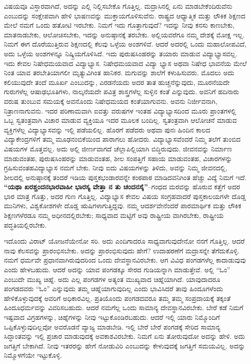 ವಿಷಯವೂ ವಿಸ್ತಾರವಾಗಿದೆ, ಅದನ್ನು ಎಲ್ಲಿ ನಿಲ್ಲಿಸಬೇಕೊ ಗೊತ್ತಿಲ್ಲ. ಮದ್ರಾಸಿನಲ್ಲಿ ಏನು ಮಾಡಬೇಕೆಂದಿರುವೆನು ಎಂಬುದನ್ನು ಸಂಕ್ಷೇಪವಾಗಿ ಹೇಳಿ ಭಾಷಣವನ್ನು ಮುಕ್ತಾಯಗೊಳಿಸುವೆನು. ರಾಷ್ಟ್ರದ ಆಧ್ಯಾತ್ಮಿಕ ಮತ್ತು ಲೌಕಿಕ ಶಿಕ್ಷಣದ ಮೇಲೆ ನಮಗೆ ಒಂದು ಹತೋಟಿ ಇರಬೇಕು. ನಿಮಗೆ ಇದು ಗೊತ್ತಾಗುವುದೆ? ಇದನ್ನು ನೀವು ಕನಸು ಕಾಣಬೇಕು, ಮಾತನಾಡಬೇಕು, ಆಲೋಚಿಸಬೇಕು, ಇದನ್ನು ಅನುಷ್ಠಾನಕ್ಕೆ ತರಬೇಕು. ಅಲ್ಲಿಯವರೆಗೂ ನಮ್ಮ ದೇಶಕ್ಕೆ ಮೋಕ್ಷ ಇಲ್ಲ. ನಿಮಗೆ ಈಗ ದೊರೆಯುತ್ತಿರುವ ಶಿಕ್ಷಣದಲ್ಲಿ ಕೆಲವು ಒಳ್ಳೆಯ ಅಂಶಗಳಿವೆ. ಆದರೆ ಅದರಲ್ಲಿ ಒಂದು ಮಹಾಲೋಪವಿದೆ, ಅದು ಒಳ್ಳೆಯ ಅಂಶಗಳನ್ನೂ ನಿಷ್ಕ್ರಿಯಗೊಳಿಸಿದೆ. ಇದು ಪುರುಷಸಿಂಹರನ್ನು ತಯಾರು ಮಾಡುವ ವಿದ್ಯಾಭ್ಯಾಸವಲ್ಲ. ಇದು ಕೇವಲ ನಿಷೇಧಮಯವಾದ ವಿದ್ಯಾಭ್ಯಾಸ. ನಿಷೇಧಮಯವಾದ ವಿದ್ಯಾ ಭ್ಯಾಸ ಅಥವಾ ನಿಷೇಧ ಭಾವನೆಯ ಮೇಲೆ ನಿಂತ ಯಾವ ತರಬೇತಿಯಾಗಲೀ ಮೃತ್ಯುವಿಗಿಂತ ಹಾನಿಕರ. ಮಗುವನ್ನು ಶಾಲೆಗೆ ಕಳುಹಿಸುವರು. ಮೊದಲು ಅದು ಕಲಿಯುವುದೇ ತಂದೆ ಮೂರ್ಖ ಎಂಬುದನ್ನು, ಎರಡನೆಯದು ಅದರ ತಾತ ಹುಚ್ಚನೆನ್ನುವುದು, ಮೂರನೆಯದೇ ಗುರುಗಳೆಲ್ಲ ಆಷಾಢಭೂತಿಗಳು, ನಾಲ್ಕನೆಯದೇ ಪವಿತ್ರ ಶಾಸ್ತ್ರಗಳೆಲ್ಲ ಸುಳ್ಳಿನ ಕಂತೆ ಎನ್ನುವುದು. ಅವನಿಗೆ ಹದಿನಾರು ವರುಷ ತುಂಬುವ ಸಮಯಕ್ಕೆ ಅವನೊಂದು ನಿಷೇಧಮಯದ ಕಂತೆಯಾಗುವನು. ಅವನು ನಿರ್ಜೀವನಾಗಿ, ನಿತ್ರಾಣನಾಗುವನು. ಇದರ ಪರಿಣಾಮವಾಗಿ ಐವತ್ತು ವರುಷಗಳ ಇಂತಹ ವಿದ್ಯಾಭ್ಯಾಸದಿಂದ ಮೂರು ಪ್ರಾಂತಗಳಲ್ಲಿ ಒಬ್ಬ ಸ್ವತಂತ್ರವಾಗಿ ವಿಚಾರ ಮಾಡುವ ವ್ಯಕ್ತಿಯೂ ಇದರ ಮೂಲಕ ಬಂದಿಲ್ಲ. ಸ್ವತಂತ್ರವಾಗಿ ಆಲೋಚನೆ ಮಾಡುವ ವ್ಯಕ್ತಿಗಳೆಲ್ಲ ವಿದ್ಯಾಭ್ಯಾಸವನ್ನು ಇಲ್ಲಿ ಪಡೆಯಲಿಲ್ಲ. ಹೊರಗೆ ಪಡೆದರು ಅಥವಾ ಪುನಃ ಹಿಂದಿನ ಕಾಲದ ವಿದ್ಯಾಕೇಂದ್ರಗಳಿಗೆ ತಮ್ಮ ಮೂಢನಂಬಿಕೆಯಿಂದ ಪಾರಾಗಲು ಹೋದರು. ವಿದ್ಯಾಭ್ಯಾಸವೆಂದರೆ ನಿಮ್ಮ ತಲೆಗೆ ತುಂಬಿದ ವಿಷಯಗಳ ಮೊತ್ತವಲ್ಲ. ಅದು ಅಲ್ಲಿ ಜೀರ್ಣವಾಗದೆ ಚೆಲ್ಲಾಪಿಲ್ಲಿಯಾಗಿ ಬಿದ್ಧಿರುವುದು. ಜೀವನವನ್ನು ನಿರ್ಮಾಣ ಮಾಡುವಂತಹ, ಪುರುಷಸಿಂಹರನ್ನು ಮಾಡುವಂತಹ, ಶೀಲ ಸಂಪತ್ತಿಗೆ ಸಹಾಯ ಮಾಡುವಂತಹ, ವಿಚಾರಗಳನ್ನು ಗ್ರಹಿಸುವಂತಹವಿದ್ಯಾಭ್ಯಾಸ ನಮಗೆ ಬೇಕು. ನೀವು ಐದು ವಿಷಯಗಳನ್ನು ತಿಳಿದು, ಅವನ್ನು ನಿಮ್ಮ ಜೀವನದಲ್ಲಿ, ಶೀಲದಲ್ಲಿ ಅನುಷ್ಠಾನಕ್ಕೆ ತಂದರೆ ಇಡಿಯ ಪುಸ್ತಕಭಂಡಾರವನ್ನೇ ಕಂಠಪಾಠ ಮಾಡಿದವನಿಗಿಂತ ಹೆಚ್ಚು ವಿದ್ಯೆ ನಿಮಗೆ ಇದೆ. \textbf{“ಯಥಾ ಖರಶ್ಚಂದನಭಾರವಾಹೀ ಭಾರಸ್ಯ ವೇತ್ತಾ ನ ತು ಚಂದನಸೈ”}–ಗಂಧದ ಮರವನ್ನು ಹೊರುವ ಕತ್ತೆಗೆ ಅದರ ಭಾರ ಮಾತ್ರ ಗೊತ್ತು, ಅದರ ಗುಣ ಗೊತ್ತಿಲ್ಲ. ವಿದ್ಯಾಭ್ಯಾಸ ಕೇವಲ ವಿಷಯ ಸಂಗ್ರಹವಾದರೆ ಪುಸ್ತಕಾಲಯಗಳೇ ದೊಡ್ಡ ಮುನಿಗಳು, ವಿಶ್ವಕೋಶಗಳೇ ದೊಡ್ಡ ಋಷಿಗಳಾಗುತ್ತಿದ್ದವು. ನಮ್ಮ ಆದರ್ಶವೇನೆಂದರೆ ಪಾರಮಾರ್ಥಿಕ ಮತ್ತು ಲೌಕಿಕ ಶಿಕ್ಷಣಗಳೆರಡೂ ನಮ್ಮ ಅಧೀನದಲ್ಲಿರಬೇಕು; ಸಾಧ್ಯವಾದ ಮಟ್ಟಿಗೆ ಅವು ರಾಷ್ಟ್ರೀಯ ವಾಗಿರಬೇಕು, ರಾಷ್ಟ್ರೀಯ ಪದ್ಧತಿಯಲ್ಲಿರಬೇಕು. 

ಇದೊಂದು ವಿರಾಟ್​ ಯೋಜನೆಯೇನೋ ಸರಿ. ಅದು ಎಂದಿಗಾದರೂ ಸಾಧ್ಯವಾಗುವುದೇನೋ ನನಗೆ ಗೊತ್ತಿಲ್ಲ. ಆದರೆ ನಾವು ಕೆಲಸವನ್ನು ಪ್ರಾರಂಭಿಸಬೇಕು. ಅದನ್ನು ಪ್ರಾರಂಭಿಸುವುದು ಹೇಗೆ? ಉದಾಹರಣೆಗೆ ಮದ್ರಾಸನ್ನೇ ತೆಗೆದುಕೊಳ್ಳಿ. ನಮಗೆ ಧರ್ಮವೇ ಪ್ರಧಾನವಾಗಿರುವುದರಿಂದ ಒಂದು ದೇವಸ್ಥಾನವಿರಬೇಕು. ಆಗ ವಿವಿಧ ಪಂಗಡಗಳೆಲ್ಲ ಕಾದಾಡುವುವು ಎಂದು ಹೇಳಬಹುದು. ಆದರೆ ಅದನ್ನು ಯಾವ ಪಂಗಡಕ್ಕೂ ಸೇರದ ಗುಡಿಯನ್ನಾಗಿ ಮಾಡುತ್ತೇವೆ. ಅಲ್ಲಿ “ಓಂ” ಎಂಬುದೇ ಮುಖ್ಯ ಚಿಹ್ನೆ. ಅದು ಎಲ್ಲ ಪಂಗಡಗಳ ಅತ್ಯಂತ ಮುಖ್ಯವಾದ ಚಿಹ್ನೆಯಾಗಿದೆ. ಯಾವುದಾದರೂ ಪಂಗಡದವರು “ಓಂ” ಎನ್ನುವುದು ತಮ್ಮ ಚಿಹ್ನೆಯಾಗುವುದಿಲ್ಲ ಎಂದು ಭಾವಿಸಿದರೆ ತಾವು ಹಿಂದೂಗಳೆಂದು ಹೇಳಿಕೊಳ್ಳುವುದಕ್ಕೆ ಅವರಿಗೆ ಅಧಿಕಾರವಿಲ್ಲ. ಪ್ರತಿಯೊಂದು ಪಂಗಡದವರೂ ತಮ್ಮ ತಮ್ಮ ಸಂಪ್ರದಾಯಕ್ಕೆ ತಕ್ಕಂತೆ ಹಿಂದೂಧರ್ಮವನ್ನು ವಿವರಿಸಬಹುದು. ಆದರೆ ನಮಗೆಲ್ಲ ಒಂದು ಸಾಮಾನ್ಯ ದೇವಸ್ಥಾನವಿರಬೇಕು. ಬೇರೆ ಕಡೆ ನಿಮಗೆ ಇಷ್ಟವಾದ ವಿಗ್ರಹಗಳನ್ನು, ಚಿಹ್ನೆಗಳನ್ನು ನೀವು ಇಟ್ಟುಕೊಂಡಿರಬಹುದು. ಆದರೆ ಇಲ್ಲಿ ಯಾರು ನಿಮ್ಮೊಂದಿಗೆ ಒಪ್ಪಿಕೊಳ್ಳುವುದಿಲ್ಲವೋ ಅವರೊಡನೆ ವ್ಯಾಜ್ಯ ಮಾಡಬೇಡಿ. ಇಲ್ಲಿ ಬೇರೆ ಬೇರೆ ಪಂಗಡಕ್ಕೆ ಸೇರಿದ ಸಾಮಾನ್ಯ ಸಿದ್ಧಾಂತವನ್ನು ಇಲ್ಲಿ ಪ್ರಚಾರ ಮಾಡುವುದಕ್ಕೆ ಅವಕಾಶವಿರಬೇಕು. ನಿಮಗೆ ಏನು ತೋರುವುದೋ ಅದನ್ನು ಹೇಳಿ. ಅದು ಜಗತ್ತಿಗೆ ಬೇಕಾಗಿದೆ. ನೀವು ಇತರರನ್ನು ಹೇಗೆ ನೋಡುವಿರಿ ಎಂಬುದನ್ನು ಕೇಳುವುದಕ್ಕೆ ಜಗತ್ತಿಗೆ ಸಮಯವಿಲ್ಲ. ಅದನ್ನು ನಿಮ್ಮೊಳಗೆಯೇ ಇಟ್ಟುಕೊಳ್ಳಿ. 

